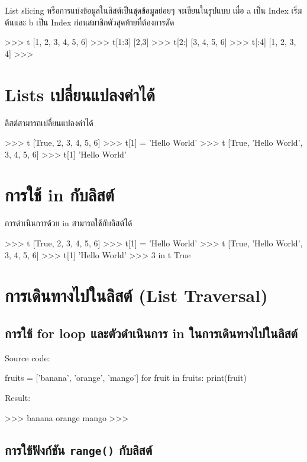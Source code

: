 List slicing หรือการแบ่งข้อมูลในลิสต์เป็นชุดข้อมูลย่อยๆ จะเขียนในรูปแบบ  \pyinline{[a:b]} เมื่อ a เป็น Index เริ่มต้นและ b เป็น Index ก่อนสมาชิกตัวสุดท้ายที่ต้องการตัด

\begin{codelist}{}{}
>>> t
[1, 2, 3, 4, 5, 6]
>>> t[1:3]
[2,3]
>>> t[2:]
[3, 4, 5, 6]
>>> t[:4]
[1, 2, 3, 4]
>>>
\end{codelist}

\section{Lists เปลี่ยนแปลงค่าได้}
ลิสต์สามารถเปลี่ยนแปลงค่าได้ 

\begin{codelist}{}{}
>>> t
[True, 2, 3, 4, 5, 6]
>>> t[1] = 'Hello World'
>>> t
[True, 'Hello World', 3, 4, 5, 6]
>>> t[1]
'Hello World'
\end{codelist}


\section{การใช้ in กับลิสต์}

การดำเนินการด้วย in สามารถใช้กับลิสต์ได้ 

\begin{codelist}{}{}
>>> t
[True, 2, 3, 4, 5, 6]
>>> t[1] = 'Hello World'
>>> t
[True, 'Hello World', 3, 4, 5, 6]
>>> t[1]
'Hello World'
>>> 3 in t
True
\end{codelist}


\section{การเดินทางไปในลิสต์ (List Traversal)}
\subsection{การใช้ for loop และตัวดำเนินการ in ในการเดินทางไปในลิสต์ }

Source code:
\begin{codelist}{}{}
fruits = ['banana', 'orange', 'mango']
for fruit in fruits: print(fruit)
\end{codelist}

Result:
\begin{codelist}{}{}
>>>
banana
orange
mango
>>>
\end{codelist}

\subsection{การใช้ฟังก์ชัน  \texttt{range()} กับลิสต์}


